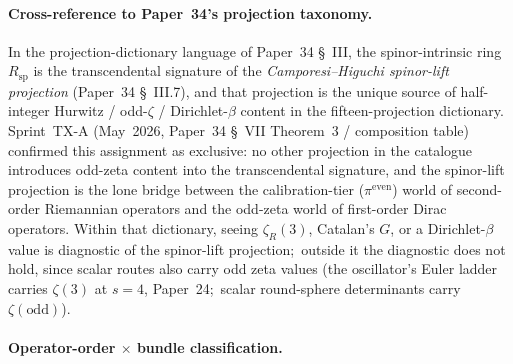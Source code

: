\documentclass[aps,pra,twocolumn,superscriptaddress,longbibliography]{revtex4-2}
\begin{document}
\paragraph{Cross-reference to Paper~34's projection taxonomy.}
In the projection-dictionary language of Paper~34 \S~III, the
spinor-intrinsic ring $R_\mathrm{sp}$ is the transcendental signature
of the \emph{Camporesi--Higuchi spinor-lift projection} (Paper~34
\S~III.7), and that projection is the unique source of half-integer
Hurwitz / odd-$\zeta$ / Dirichlet-$\beta$ content in the
fifteen-projection dictionary.  Sprint~TX-A (May~2026, Paper~34
\S~VII Theorem~3 / composition table) confirmed this assignment as
exclusive: no other projection in the catalogue introduces odd-zeta
content into the transcendental signature, and the spinor-lift
projection is the lone bridge between the calibration-tier
($\pi^{\text{even}}$) world of second-order Riemannian operators and
the odd-zeta world of first-order Dirac operators.  Within that
dictionary, seeing $\zeta_R(3)$, Catalan's $G$, or a Dirichlet-$\beta$
value is diagnostic of the spinor-lift projection;\ outside it the
diagnostic does not hold, since scalar routes also carry odd zeta
values (the oscillator's Euler ladder carries $\zeta(3)$ at $s = 4$,
Paper~24;\ scalar round-sphere determinants carry $\zeta(\text{odd})$).


\paragraph{Operator-order $\times$ bundle classification.}
\end{document}
